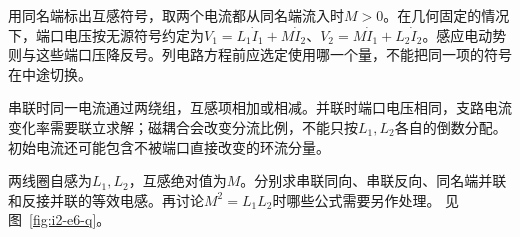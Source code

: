 用同名端标出互感符号，取两个电流都从同名端流入时$M>0$。在几何固定的情况下，端口电压按无源符号约定为$V_1=L_1\dot I_1+M\dot I_2$、$V_2=M\dot I_1+L_2\dot I_2$。感应电动势则与这些端口压降反号。列电路方程前应选定使用哪一个量，不能把同一项的符号在中途切换。

串联时同一电流通过两绕组，互感项相加或相减。并联时端口电压相同，支路电流变化率需要联立求解；磁耦合会改变分流比例，不能只按$L_1,L_2$各自的倒数分配。初始电流还可能包含不被端口直接改变的环流分量。


\begin{example}[串并联等效电感及完全耦合]\label{ex:i2-e6}
两线圈自感为$L_1,L_2$，互感绝对值为$M$。分别求串联同向、串联反向、同名端并联和反接并联的等效电感。再讨论$M^2=L_1L_2$时哪些公式需要另作处理。 见图~\ref{fig:i2-e6-q}。
\end{example}

